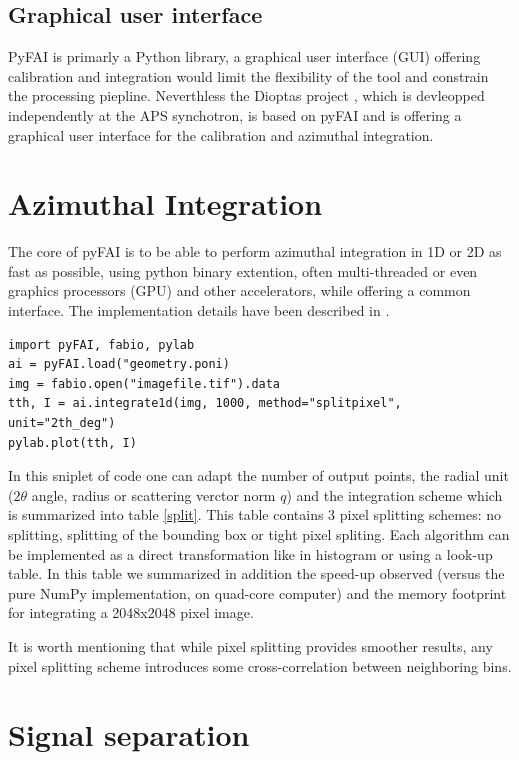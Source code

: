 \documentclass[preprint]{iucr}
\begin{document}
\subsection{Graphical user interface}
PyFAI is primarly a Python library, a graphical user interface (GUI) offering
calibration and integration would limit the flexibility of the tool and
constrain the processing piepline. 
Neverthless the Dioptas project 
\cite{diopas}, which is devleopped independently at the APS synchotron, is based
on pyFAI and is offering a graphical user interface for the calibration and
azimuthal integration.

\section{Azimuthal Integration}

The core of pyFAI is to be able to perform azimuthal integration in 1D or 2D as
fast as possible, using python binary extention, often multi-threaded or even
graphics processors (GPU) and other accelerators, while offering a common
interface. 
The implementation details have been described in
\cite{kieffer_ashiotis-proc-euroscipy-2014}.

\begin{verbatim}
import pyFAI, fabio, pylab
ai = pyFAI.load("geometry.poni)
img = fabio.open("imagefile.tif").data
tth, I = ai.integrate1d(img, 1000, method="splitpixel", unit="2th_deg")
pylab.plot(tth, I)
\end{verbatim}
In this sniplet of code one can adapt the number of output points, 
the radial unit ($2\theta$ angle, radius or scattering verctor norm $q$) and the
integration scheme which is summarized into table \ref{split}.
This table contains 3 pixel splitting schemes: no splitting, splitting of the
bounding box or tight pixel spliting. Each algorithm can be implemented as a
direct transformation like in histogram or using a look-up table.
 In this table we summarized in addition the speed-up observed (versus the pure
 NumPy \cite{numpy} implementation, on  quad-core computer) and the memory
 footprint for integrating a 2048x2048 pixel image.

It is worth mentioning that while pixel splitting provides smoother results, any
pixel splitting scheme introduces some cross-correlation between
neighboring bins\cite{billinge2014}.

\section{Signal separation}
\end{document}
